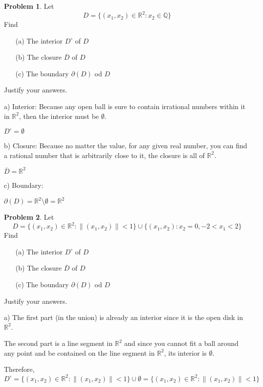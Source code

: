 \documentclass{amsart}
\theoremstyle{definition}
\newtheorem{xca}{Problem}
\newcommand{\R}{\mathbb{R}}
\newcommand{\cl}{\overline}
\newcommand{\norm}[1]{\lVert#1\rVert}
\newcommand{\lskip}{\newpage}
\begin{document}
\begin{xca}

Let $$D=\{(x_1,x_2)\in \R^2:  x_2\in \mathbb{Q}\}$$
Find
\begin{itemize}
\item [(a)] The interior $D^\circ$ of $D$
\smallskip
\item [(b)] The closure $\cl{D}$ of $D$
\smallskip
\item [(c)] The boundary $\partial(D)$ od $D$
\end{itemize}
\smallskip
Justify your answers.
\end{xca}


a) Interior: Because any open ball is sure to contain
irrational numbers within it in $\R^2$, then the interior must be $\emptyset$.

$D^\circ = \emptyset$

b) Closure: Because no matter the value, for any given real number, you can find a
rational number that is arbitrarily close to it, the closure is all of $\R^2$.

$\cl{D} = \R^2$

c) Boundary:

$\partial(D) = \R^2 \setminus \emptyset = \R^2$



\lskip






\begin{xca}
Let $$D=\{(x_1,x_2)\in \R^2:  \norm{(x_1, x_2)}<1\}\cup \{(x_1,x_2):x_2=0, -2<x_1<2\}$$
Find
\begin{itemize}
\item [(a)] The interior $D^\circ$ of $D$
\smallskip
\item [(b)] The closure $\cl{D}$ of $D$
\smallskip
\item [(c)] The boundary $\partial(D)$ od $D$
\end{itemize}
\smallskip
Justify your answers.
\end{xca}


a) The first part (in the union) is already an interior since it is the open disk
in $\R^2$.

The second part is a line segment in $\R^2$ and since you cannot fit a ball around
any point and be contained on the line segment in $\R^2$, its interior is $\emptyset$.

Therefore, $D^\circ = \{(x_1,x_2)\in \R^2:  \norm{(x_1, x_2)}<1\} \cup \emptyset = \{(x_1,x_2)\in \R^2:  \norm{(x_1, x_2)}<1\}$
\end{document}
